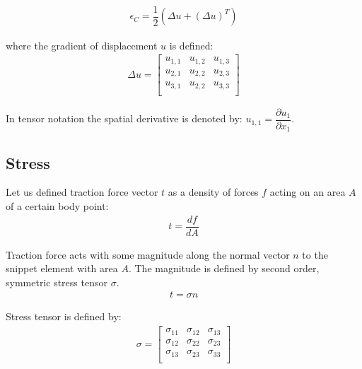 \documentclass[en]{minipw} %
\begin{document}
\begin{equation}
\begin{aligned}
\epsilon_C = \dfrac{1}{2}(\Delta u + (\Delta u)^{T})
\end{aligned}
\end{equation}

where the gradient of displacement $u$ is defined:
\begin{equation}
\begin{aligned}
\Delta u =
\begin{bmatrix}
u_{1,1} & u_{1,2} & u_{1,3} \\
u_{2,1} & u_{2,2} & u_{2,3} \\
u_{3,1} & u_{2,2} & u_{3,3} \\
\end{bmatrix}
\end{aligned}
\end{equation}

In tensor notation the spatial derivative is denoted by: $u_{1,1} = \dfrac{\partial u_1}{\partial x_1}$.

\subsection{Stress}
Let us defined traction force vector $t$ as a density of forces $f$ acting on an area $A$ of a certain body point:
\begin{equation}
\begin{aligned}
t = \dfrac{df}{dA}
\end{aligned}
\end{equation}

Traction force acts with some magnitude along the normal vector $n$ to the snippet element with area $A$. The magnitude is defined by second order, symmetric stress tensor $\sigma$.
\begin{equation}
\begin{aligned}
t = \sigma n
\end{aligned}
\end{equation}

Stress tensor is defined by:
\begin{equation}
\begin{aligned}
\sigma =
\begin{bmatrix}
\sigma_{11} & \sigma_{12} & \sigma_{13} \\
\sigma_{12} & \sigma_{22} & \sigma_{23} \\
\sigma_{13} & \sigma_{23} & \sigma_{33} \\
\end{bmatrix}
\end{aligned}
\end{equation}
\end{document}
